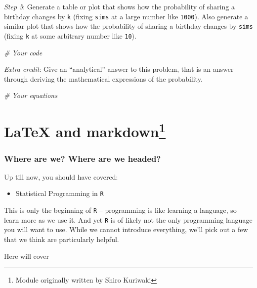 \documentclass[]{book}
\newenvironment{Shaded}{\begin{snugshade}}{\end{snugshade}}
\newcommand{\CommentTok}[1]{\textcolor[rgb]{0.56,0.35,0.01}{\textit{#1}}}
\providecommand{\tightlist}{%
  \setlength{\itemsep}{0pt}\setlength{\parskip}{0pt}}
\let\rmarkdownfootnote\footnote%
\def\footnote{\protect\rmarkdownfootnote}
\theoremstyle{definition}
\theoremstyle{definition}
\theoremstyle{definition}
\theoremstyle{remark}
\begin{document}
\emph{Step 5}: Generate a table or plot that shows how the probability
of sharing a birthday changes by \texttt{k} (fixing \texttt{sims} at a
large number like \texttt{1000}). Also generate a similar plot that
shows how the probability of sharing a birthday changes by \texttt{sims}
(fixing \texttt{k} at some arbitrary number like \texttt{10}).

\begin{Shaded}
\begin{Highlighting}[]
\CommentTok{# Your code}
\end{Highlighting}
\end{Shaded}

\emph{Extra credit}: Give an ``analytical'' answer to this problem, that
is an answer through deriving the mathematical expressions of the
probability.

\begin{Shaded}
\begin{Highlighting}[]
\CommentTok{# Your equations}
\end{Highlighting}
\end{Shaded}

\chapter[LaTeX and markdown]{\texorpdfstring{LaTeX and
markdown\footnote{Module originally written by Shiro Kuriwaki}}{LaTeX and markdown}}\label{nonwysiwyg}

\subsection*{Where are we? Where are we
headed?}\label{where-are-we-where-are-we-headed-6}

Up till now, you should have covered:

\begin{itemize}
\tightlist
\item
  Statistical Programming in \texttt{R}
\end{itemize}

This is only the beginning of \texttt{R} -- programming is like learning
a language, so learn more as we use it. And yet \texttt{R} is of likely
not the only programming language you will want to use. While we cannot
introduce everything, we'll pick out a few that we think are
particularly helpful.

Here will cover
\end{document}

